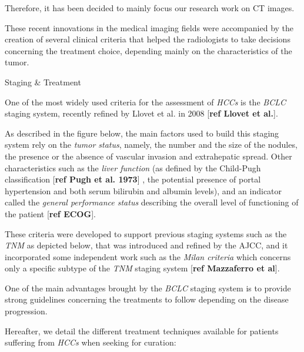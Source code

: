 \documentclass[]{article}
\begin{document}
Therefore, it has been decided to mainly focus our research work on CT
images.

These recent innovations in the medical imaging fields were accompanied
by the creation of several clinical criteria that helped the
radiologists to take decisions concerning the treatment choice,
depending mainly on the characteristics of the tumor.

\protect\hypertarget{anchor-9}{}{}Staging \& Treatment

One of the most widely used criteria for the assessment of \emph{HCCs}
is the \emph{BCLC} staging system, recently refined by Llovet et al. in
2008 {[}\textbf{ref Llovet et al.}{]}.

As described in the figure below, the main factors used to build this
staging system rely on the \emph{tumor status}, namely, the number and
the size of the nodules, the presence or the absence of vascular
invasion and extrahepatic spread. Other characteristics such as the
\emph{liver function} (as defined by the Child-Pugh classification
{[}\textbf{ref Pugh et al. 1973}{]} , the potential presence of portal
hypertension and both serum bilirubin and albumin levels), and an
indicator called the \emph{general performance status} describing the
overall level of functioning of the patient {[}\textbf{ref ECOG}{]}.

These criteria were developed to support previous staging systems such
as the \emph{TNM} as depicted below, that was introduced and refined by
the AJCC, and it incorporated some independent work such as the
\emph{Milan criteria} which concerns only a specific subtype of the
\emph{TNM} staging system {[}\textbf{ref Mazzaferro et al}{]}.

One of the main advantages brought by the \emph{BCLC} staging system is
to provide strong guidelines concerning the treatments to follow
depending on the disease progression.

Hereafter, we detail the different treatment techniques available for
patients suffering from \emph{HCCs }when seeking for curation:
\end{document}
